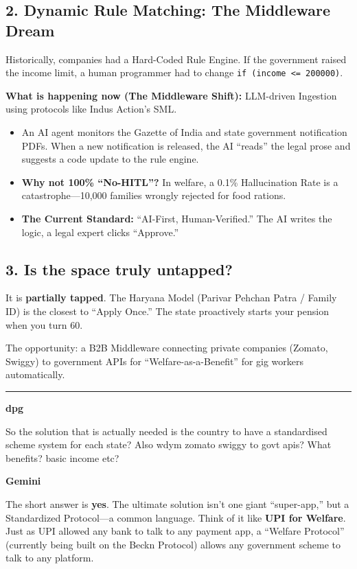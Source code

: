 \documentclass[11pt,a4paper]{article}
\begin{document}
\subsection*{2. Dynamic Rule Matching: The Middleware Dream}
Historically, companies had a Hard-Coded Rule Engine. If the government raised the income limit, a human programmer had to change \texttt{if (income <= 200000)}.

\textbf{What is happening now (The Middleware Shift):} LLM-driven Ingestion using protocols like Indus Action's SML.
\begin{itemize}[nosep]
\item An AI agent monitors the Gazette of India and state government notification PDFs. When a new notification is released, the AI ``reads'' the legal prose and suggests a code update to the rule engine.
\item \textbf{Why not 100\% ``No-HITL''?} In welfare, a 0.1\% Hallucination Rate is a catastrophe---10,000 families wrongly rejected for food rations.
\item \textbf{The Current Standard:} ``AI-First, Human-Verified.'' The AI writes the logic, a legal expert clicks ``Approve.''
\end{itemize}

\subsection*{3. Is the space truly untapped?}
It is \textbf{partially tapped}. The Haryana Model (Parivar Pehchan Patra / Family ID) is the closest to ``Apply Once.'' The state proactively starts your pension when you turn 60.

The opportunity: a B2B Middleware connecting private companies (Zomato, Swiggy) to government APIs for ``Welfare-as-a-Benefit'' for gig workers automatically.

\bigskip
\hrule
\bigskip


{\small\color{primary}\textbf{dpg}}
\begin{mebox}
So the solution that is actually needed is the country to have a standardised scheme system for each state? Also wdym zomato swiggy to govt apis? What benefits? basic income etc?
\end{mebox}

{\small\color{secondary}\textbf{Gemini}}\vspace{2pt}

The short answer is \textbf{yes}. The ultimate solution isn't one giant ``super-app,'' but a Standardized Protocol---a common language. Think of it like \textbf{UPI for Welfare}. Just as UPI allowed any bank to talk to any payment app, a ``Welfare Protocol'' (currently being built on the Beckn Protocol) allows any government scheme to talk to any platform.
\end{document}
